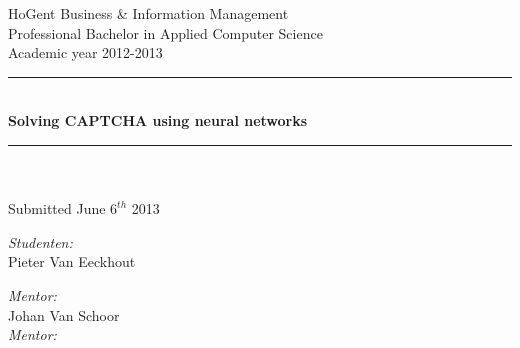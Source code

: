 \documentclass[pdftex,a4paper,12pt,twoside]{report}
\newcommand{\HRule}{\rule{\linewidth}{0.5mm}}
\newcommand{\emptypage}{
\newpage
\thispagestyle{empty}
\mbox{}
\newpage
}
\theoremstyle{plain} \newtheorem{theorem}{Theorem} \newtheorem{proposition}{Proposition} \newtheorem{lemma}{Lemma} \newtheorem*{corollary}{Corollary}
\theoremstyle{definition} \newtheorem{definition}{Definition} \newtheorem{conjecture}{Conjecture} \newtheorem*{example}{Example} \newtheorem{algorithm}{Algorithm}
\theoremstyle{remark} \newtheorem*{remark}{Remark} \newtheorem*{note}{Note} \newtheorem{case}{Case}
\newcommand{\captchasp}{CAPTCHA }
\newcommand{\studenta}{Pieter {Van Eeckhout}}
\newcommand{\begeleider}{Johan {Van Schoor}}
\newcommand{\titel}{Solving \captchasp using neural networks}
\newcommand{\ondertitel}{}
\newcommand{\datum}{June $6^{th}$ 2013}
\newcommand{\academiejaar}{2012-2013}
\begin{document}
\emptypage


\begin{titlepage}
\begin{center}
HoGent Business \& Information Management\\
Professional Bachelor in Applied Computer Science\\
Academic year \academiejaar

\vfill

\HRule \\[0.4cm]
{ \huge \bfseries \titel}\\[0.4cm]
\HRule \\[0.4cm]

{\Large \ondertitel}\\[0.4cm]

Submitted \datum

\vfill

\begin{minipage}{0.49\textwidth}
\begin{flushleft}
\emph{Student\ifdefined\studentb en\fi :}\\
\studenta \\
\ifdefined\studentb \studentb \fi\par
\end{flushleft}
\end{minipage}
\begin{minipage}{0.49\textwidth}
\begin{flushright}
\emph{Mentor:}\\ \begeleider\\
\ifdefined\mentor \emph{Mentor:}\\ \mentor \fi
\end{flushright}
\end{minipage}

\end{center}

\end{titlepage}


\emptypage


\tableofcontents


\end{document}
